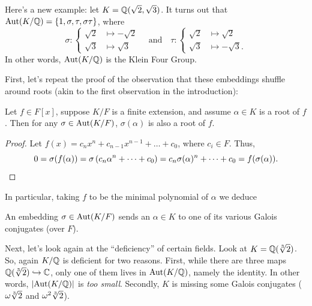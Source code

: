 \begin{example}
	Here's a new example: let $K = \mathbb Q(\sqrt2, \sqrt3)$.
	It turns out that $\operatorname{Aut}(K/\mathbb Q) = \{1, \sigma, \tau, \sigma\tau\}$, where
	\[
		\sigma :
		\begin{cases}
			\sqrt2 &\mapsto -\sqrt2 \\
			\sqrt3 &\mapsto \sqrt3
		\end{cases}
		\quad\text{and}\quad
		\tau :
		\begin{cases}
			\sqrt2 &\mapsto \sqrt2 \\
			\sqrt3 &\mapsto -\sqrt3.
		\end{cases}
	\]
	In other words, $\operatorname{Aut}(K/\mathbb Q)$ is the Klein Four Group.
\end{example}

First, let's repeat the proof of the observation that these embeddings shuffle around roots
(akin to the first observation in the introduction):
\begin{lemma}
	Let $f \in F[x]$, suppose $K/F$ is a finite extension,
	and assume $\alpha \in K$ is a root of $f$.
	Then for any $\sigma \in \operatorname{Aut}(K/F)$, $\sigma(\alpha)$ is also a root of $f$.
	\label{lem:root_shuffle}
\end{lemma}
\begin{proof}
	Let $f(x) = c_n x^n + c_{n-1}x^{n-1} + \dots + c_0$,
	where $c_i \in F$. Thus,
	\[ 0 = \sigma(f(\alpha)) = \sigma\left( c_n\alpha^n + \dots + c_0 \right)
	= c_n\sigma(\alpha)^n + \dots + c_0 = f(\sigma(\alpha)). \qedhere \]
\end{proof}
In particular, taking $f$ to be the minimal polynomial of $\alpha$ we deduce
\begin{moral}
	An embedding $\sigma \in \operatorname{Aut}(K/F)$ sends an $\alpha \in K$
	to one of its various Galois conjugates (over $F$).
\end{moral}

Next, let's look again at the ``deficiency'' of certain fields.
Look at $K = \mathbb Q(\sqrt[3]{2})$.
So, again $K / \mathbb Q$ is deficient for two reasons.
First, while there are three maps $\mathbb Q(\sqrt[3]{2}) \hookrightarrow \mathbb C$,
only one of them lives in $\operatorname{Aut}(K/\mathbb Q)$, namely the identity.
In other words, $\left\lvert \operatorname{Aut}(K/\mathbb Q) \right\rvert$ is \emph{too small}.
Secondly, $K$ is missing some Galois conjugates ($\omega \sqrt[3]{2}$ and $\omega^2 \sqrt[3]{2}$).

